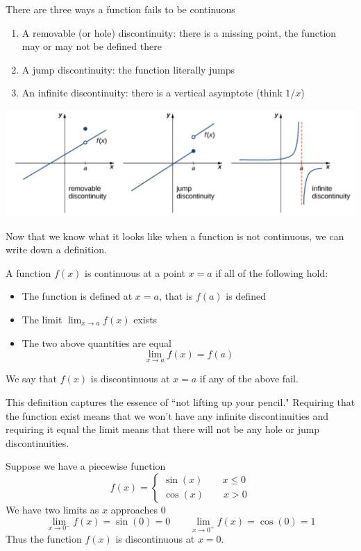 There are three ways a function fails to be continuous
\begin{enumerate}
	\item A removable (or hole) discontinuity: there is a missing point, the function may or may not be defined there
	\item A jump discontinuity: the function literally jumps
	\item An infinite discontinuity: there is a vertical asymptote (think $1/x$)
\end{enumerate}

\begin{center}
	\includegraphics[scale=0.55]{images/Figure 2.3.1.png} 
\end{center}

Now that we know what it looks like when a function is not continuous, we can write down a definition. 
\begin{definition}
	A function $f(x)$ is continuous at a point $x = a$ if all of the following hold:
	\begin{itemize}
		\item The function is defined at $x = a$, that is $f(a)$ is defined
		\item The limit $\lim_{x \to a} f(x)$ exists
		\item The two above quantities are equal
		\[ \lim_{x \to a} f(x) = f(a) \]
	\end{itemize}
	We say that $f(x)$ is discontinuous at $x = a$ if any of the above fail.
\end{definition}

This definition captures the essence of ``not lifting up your pencil." Requiring that the function exist means that we won't have any infinite discontinuities and requiring it equal the limit means that there will not be any hole or jump discontinuities.

\begin{example}
	Suppose we have a piecewise function
	\[ f(x) = \begin{cases}
	\sin(x) \qquad x \leq 0 \\
	\cos(x) \qquad x > 0
	\end{cases} \]
	We have two limits as $x$ approaches 0
	\[ \lim_{x \to 0^-} f(x) = \sin(0) = 0 \qquad \lim_{x \to 0^+} f(x) = \cos(0) = 1 \]
	Thus the function $f(x)$ is discontinuous at $x = 0$.
\end{example}

